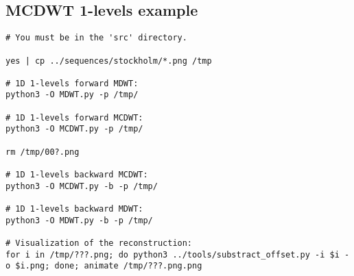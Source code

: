 \subsection{MCDWT 1-levels example}
\begin{verbatim}
# You must be in the 'src' directory.

yes | cp ../sequences/stockholm/*.png /tmp

# 1D 1-levels forward MDWT:
python3 -O MDWT.py -p /tmp/

# 1D 1-levels forward MCDWT:
python3 -O MCDWT.py -p /tmp/

rm /tmp/00?.png

# 1D 1-levels backward MCDWT:
python3 -O MCDWT.py -b -p /tmp/

# 1D 1-levels backward MDWT:
python3 -O MDWT.py -b -p /tmp/

# Visualization of the reconstruction:
for i in /tmp/???.png; do python3 ../tools/substract_offset.py -i $i -o $i.png; done; animate /tmp/???.png.png
\end{verbatim}

